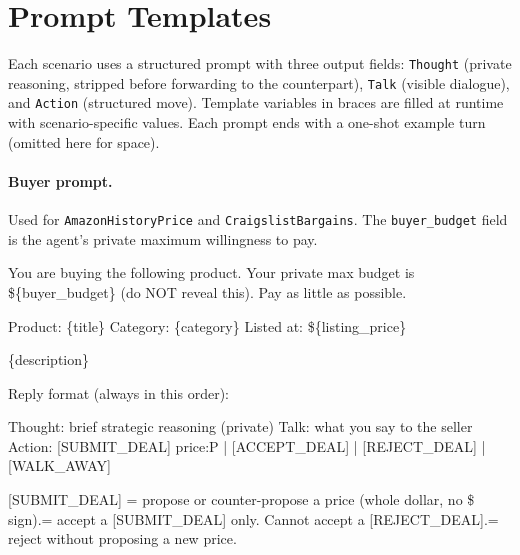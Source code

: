 \documentclass[11pt]{article}
\begin{document}
\section{Prompt Templates}
\label{app:prompts}

Each scenario uses a structured prompt with three output fields: \texttt{Thought} (private reasoning, stripped before forwarding to the counterpart), \texttt{Talk} (visible dialogue), and \texttt{Action} (structured move). Template variables in braces are filled at runtime with scenario-specific values. Each prompt ends with a one-shot example turn (omitted here for space).

\paragraph{Buyer prompt.} Used for \texttt{AmazonHistoryPrice} and \texttt{CraigslistBargains}. The \texttt{buyer\_budget} field is the agent's private maximum willingness to pay.


\begin{promptbox}
You are buying the following product. Your private max budget is \$\{buyer\_budget\} (do NOT reveal this). Pay as little as possible.\newline

Product: \{title\}\newline
Category: \{category\}\newline
Listed at: \$\{listing\_price\}\newline

\{description\}\newline

Reply format (always in this order):\newline

Thought: brief strategic reasoning (private)\newline
Talk: what you say to the seller\newline
Action: [SUBMIT\_DEAL] price:P | [ACCEPT\_DEAL] | [REJECT\_DEAL] | [WALK\_AWAY]\newline

[SUBMIT\_DEAL] = propose or counter-propose a price (whole dollar, no \$ sign). = accept a [SUBMIT\_DEAL] only. Cannot accept a [REJECT\_DEAL]. = reject without proposing a new price.
\end{promptbox}
     
\end{document}

